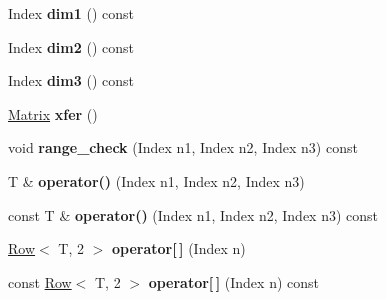 \begin{DoxyCompactItemize}
\item 
Index {\bfseries dim1} () const \hypertarget{classcpt_1_1Matrix_3_01T_00_013_01_4_abe26748182cf83aa18b1929dd420e354}{}\label{classcpt_1_1Matrix_3_01T_00_013_01_4_abe26748182cf83aa18b1929dd420e354}

\item 
Index {\bfseries dim2} () const \hypertarget{classcpt_1_1Matrix_3_01T_00_013_01_4_a05ded0ebe3afc85f2e2a376726e7986c}{}\label{classcpt_1_1Matrix_3_01T_00_013_01_4_a05ded0ebe3afc85f2e2a376726e7986c}

\item 
Index {\bfseries dim3} () const \hypertarget{classcpt_1_1Matrix_3_01T_00_013_01_4_a21c01412da6cf4b7cf0ced37432909f9}{}\label{classcpt_1_1Matrix_3_01T_00_013_01_4_a21c01412da6cf4b7cf0ced37432909f9}

\item 
\hyperlink{classcpt_1_1Matrix}{Matrix} {\bfseries xfer} ()\hypertarget{classcpt_1_1Matrix_3_01T_00_013_01_4_ab9afe822827a66ad21665acd2e451c3e}{}\label{classcpt_1_1Matrix_3_01T_00_013_01_4_ab9afe822827a66ad21665acd2e451c3e}

\item 
void {\bfseries range\+\_\+check} (Index n1, Index n2, Index n3) const \hypertarget{classcpt_1_1Matrix_3_01T_00_013_01_4_a0274eac82ae1de0533a513dea37cbc5e}{}\label{classcpt_1_1Matrix_3_01T_00_013_01_4_a0274eac82ae1de0533a513dea37cbc5e}

\item 
T \& {\bfseries operator()} (Index n1, Index n2, Index n3)\hypertarget{classcpt_1_1Matrix_3_01T_00_013_01_4_ade6d64d8d5ccea0ed60e768e95ec4ade}{}\label{classcpt_1_1Matrix_3_01T_00_013_01_4_ade6d64d8d5ccea0ed60e768e95ec4ade}

\item 
const T \& {\bfseries operator()} (Index n1, Index n2, Index n3) const \hypertarget{classcpt_1_1Matrix_3_01T_00_013_01_4_a17b120d19ec12acfbc4c9be10524d72a}{}\label{classcpt_1_1Matrix_3_01T_00_013_01_4_a17b120d19ec12acfbc4c9be10524d72a}

\item 
\hyperlink{classcpt_1_1Row}{Row}$<$ T, 2 $>$ {\bfseries operator\mbox{[}$\,$\mbox{]}} (Index n)\hypertarget{classcpt_1_1Matrix_3_01T_00_013_01_4_ae241aef17c7fbabeea716cc633ea8243}{}\label{classcpt_1_1Matrix_3_01T_00_013_01_4_ae241aef17c7fbabeea716cc633ea8243}

\item 
const \hyperlink{classcpt_1_1Row}{Row}$<$ T, 2 $>$ {\bfseries operator\mbox{[}$\,$\mbox{]}} (Index n) const \hypertarget{classcpt_1_1Matrix_3_01T_00_013_01_4_a9f87109cad7ac11f09f73746ac1db542}{}\label{classcpt_1_1Matrix_3_01T_00_013_01_4_a9f87109cad7ac11f09f73746ac1db542}


\end{DoxyCompactItemize}
